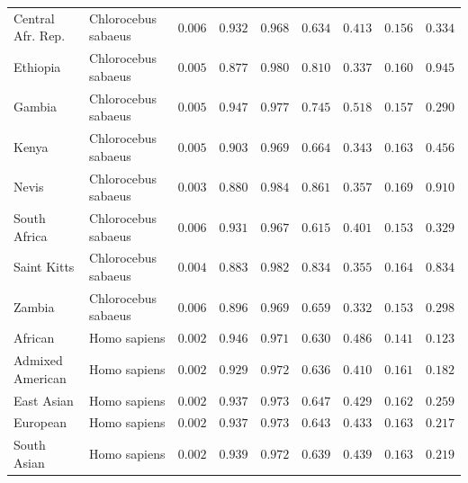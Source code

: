 \documentclass[12pt]{article}
\begin{document}
\begin{center}
\begin{adjustbox}{width=\textwidth}
\begin{tabular}{||l|l|r||r|r||r|r||r|r||}
                \rowcolor{LIGHTGREY} Central Afr. Rep.       & Chlorocebus sabaeus & $ 0.006$ & $ 0.932$ & $ 0.968$ & $ 0.634$ & $ 0.413$ & $ 0.156$ & $ 0.334$ \\
                \rowcolor{LIGHTGREY} Ethiopia        & Chlorocebus sabaeus & $ 0.005$ & $ 0.877$ & $ 0.980$ & $ 0.810$ & $ 0.337$ & $ 0.160$ & $ 0.945$ \\
                \rowcolor{LIGHTGREY} Gambia             & Chlorocebus sabaeus & $ 0.005$ & $ 0.947$ & $ 0.977$ & $ 0.745$ & $ 0.518$ & $ 0.157$ & $ 0.290$ \\
                \rowcolor{LIGHTGREY} Kenya                                 & Chlorocebus sabaeus        & $ 0.005$ & $ 0.903$ & $ 0.969$ & $ 0.664$ & $ 0.343$ & $ 0.163$ & $ 0.456$ \\
                \rowcolor{LIGHTGREY} Nevis                        & Chlorocebus sabaeus        & $ 0.003$ & $ 0.880$ & $ 0.984$ & $ 0.861$ & $ 0.357$ & $ 0.169$ & $ 0.910$ \\
                \rowcolor{LIGHTGREY} South Africa                              & Chlorocebus sabaeus        & $ 0.006$ & $ 0.931$ & $ 0.967$ & $ 0.615$ & $ 0.401$ & $ 0.153$ & $ 0.329$ \\
                \rowcolor{LIGHTGREY} Saint Kitts                                & Chlorocebus sabaeus        & $ 0.004$ & $ 0.883$ & $ 0.982$ & $ 0.834$ & $ 0.355$ & $ 0.164$ & $ 0.834$ \\
                \rowcolor{LIGHTGREY} Zambia                             & Chlorocebus sabaeus        & $ 0.006$ & $ 0.896$ & $ 0.969$ & $ 0.659$ & $ 0.332$ & $ 0.153$ & $ 0.298$ \\
                African                             & Homo sapiens        & $ 0.002$ & $ 0.946$ & $ 0.971$ & $ 0.630$ & $ 0.486$ & $ 0.141$ & $ 0.123$ \\
                Admixed American                             & Homo sapiens        & $ 0.002$ & $ 0.929$ & $ 0.972$ & $ 0.636$ & $ 0.410$ & $ 0.161$ & $ 0.182$ \\
                East Asian                             & Homo sapiens        & $ 0.002$ & $ 0.937$ & $ 0.973$ & $ 0.647$ & $ 0.429$ & $ 0.162$ & $ 0.259$ \\
                European                             & Homo sapiens        & $ 0.002$ & $ 0.937$ & $ 0.973$ & $ 0.643$ & $ 0.433$ & $ 0.163$ & $ 0.217$ \\
                South Asian                             & Homo sapiens        & $ 0.002$ & $ 0.939$ & $ 0.972$ & $ 0.639$ & $ 0.439$ & $ 0.163$ & $ 0.219$ \\
                \bottomrule
            \end{tabular}
        \end{adjustbox}
    \end{center}
\end{document}
